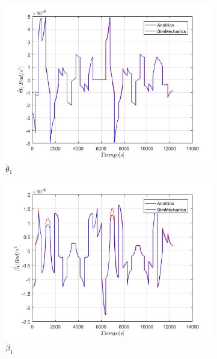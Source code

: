 \begin{figure}
    \centering
    \begin{subfigure}{0.45\textwidth}
        \includegraphics[width=\linewidth]{Cap4_DisenoBasico/Figura/ComparativoSimMechanics/ThetaPPunto1.jpg}
        \caption{$\ddot{\theta}_1$}
    \end{subfigure}
    \begin{subfigure}{0.45\textwidth}
        \includegraphics[width=\linewidth]{Cap4_DisenoBasico/Figura/ComparativoSimMechanics/BetaPPunto1.jpg}
        \caption{$\ddot{\beta}_1$}
    \end{subfigure}
    \begin{subfigure}{0.45\textwidth}

\end{subfigure}
\end{figure}
